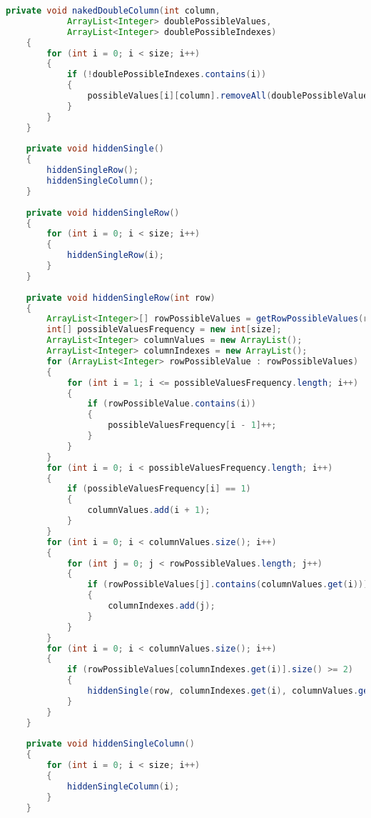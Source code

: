 \begin{lstlisting}[language=Java,basicstyle=\tiny,caption=SolverRuleBased.java]
    private void nakedDoubleColumn(int column,
            ArrayList<Integer> doublePossibleValues, 
            ArrayList<Integer> doublePossibleIndexes)
    {
        for (int i = 0; i < size; i++)
        {
            if (!doublePossibleIndexes.contains(i))
            {
                possibleValues[i][column].removeAll(doublePossibleValues);
            }
        }
    }
    
    private void hiddenSingle()
    {
        hiddenSingleRow();
        hiddenSingleColumn();
    }
    
    private void hiddenSingleRow()
    {
        for (int i = 0; i < size; i++)
        {
            hiddenSingleRow(i);
        }
    }
    
    private void hiddenSingleRow(int row)
    {
        ArrayList<Integer>[] rowPossibleValues = getRowPossibleValues(row);
        int[] possibleValuesFrequency = new int[size];
        ArrayList<Integer> columnValues = new ArrayList();
        ArrayList<Integer> columnIndexes = new ArrayList();
        for (ArrayList<Integer> rowPossibleValue : rowPossibleValues)
        {
            for (int i = 1; i <= possibleValuesFrequency.length; i++)
            {
                if (rowPossibleValue.contains(i))
                {
                    possibleValuesFrequency[i - 1]++;
                }
            }
        }
        for (int i = 0; i < possibleValuesFrequency.length; i++)
        {
            if (possibleValuesFrequency[i] == 1)
            {
                columnValues.add(i + 1);
            }
        }
        for (int i = 0; i < columnValues.size(); i++)
        {
            for (int j = 0; j < rowPossibleValues.length; j++)
            {
                if (rowPossibleValues[j].contains(columnValues.get(i)))
                {
                    columnIndexes.add(j);
                }
            }
        }
        for (int i = 0; i < columnValues.size(); i++)
        {
            if (rowPossibleValues[columnIndexes.get(i)].size() >= 2)
            {
                hiddenSingle(row, columnIndexes.get(i), columnValues.get(i));
            }
        }
    }
    
    private void hiddenSingleColumn()
    {
        for (int i = 0; i < size; i++)
        {
            hiddenSingleColumn(i);
        }
    }
    

\end{lstlisting}
